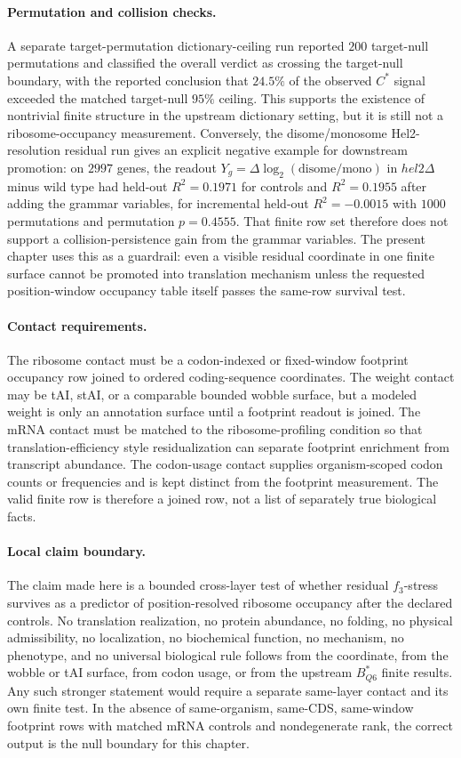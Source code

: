 \paragraph{Permutation and collision checks.}
A separate target-permutation dictionary-ceiling run reported $200$ target-null permutations and classified the overall verdict as crossing the target-null boundary, with the reported conclusion that $24.5\%$ of the observed $C^*$ signal exceeded the matched target-null $95\%$ ceiling.  This supports the existence of nontrivial finite structure in the upstream dictionary setting, but it is still not a ribosome-occupancy measurement.  Conversely, the disome/monosome Hel2-resolution residual run gives an explicit negative example for downstream promotion: on $2997$ genes, the readout $Y_g=\Delta\log_2(\mathrm{disome}/\mathrm{mono})$ in $hel2\Delta$ minus wild type had held-out $R^2=0.1971$ for controls and $R^2=0.1955$ after adding the grammar variables, for incremental held-out $R^2=-0.0015$ with $1000$ permutations and permutation $p=0.4555$.  That finite row set therefore does not support a collision-persistence gain from the grammar variables.  The present chapter uses this as a guardrail: even a visible residual coordinate in one finite surface cannot be promoted into translation mechanism unless the requested position-window occupancy table itself passes the same-row survival test.

\paragraph{Contact requirements.}
The ribosome contact must be a codon-indexed or fixed-window footprint occupancy row joined to ordered coding-sequence coordinates.  The weight contact may be tAI, stAI, or a comparable bounded wobble surface, but a modeled weight is only an annotation surface until a footprint readout is joined.  The mRNA contact must be matched to the ribosome-profiling condition so that translation-efficiency style residualization can separate footprint enrichment from transcript abundance.  The codon-usage contact supplies organism-scoped codon counts or frequencies and is kept distinct from the footprint measurement.  The valid finite row is therefore a joined row, not a list of separately true biological facts.

\paragraph{Local claim boundary.}
The claim made here is a bounded cross-layer test of whether residual $f_3$-stress survives as a predictor of position-resolved ribosome occupancy after the declared controls.  No translation realization, no protein abundance, no folding, no physical admissibility, no localization, no biochemical function, no mechanism, no phenotype, and no universal biological rule follows from the coordinate, from the wobble or tAI surface, from codon usage, or from the upstream $B^*_{Q6}$ finite results.  Any such stronger statement would require a separate same-layer contact and its own finite test.  In the absence of same-organism, same-CDS, same-window footprint rows with matched mRNA controls and nondegenerate rank, the correct output is the null boundary for this chapter.
